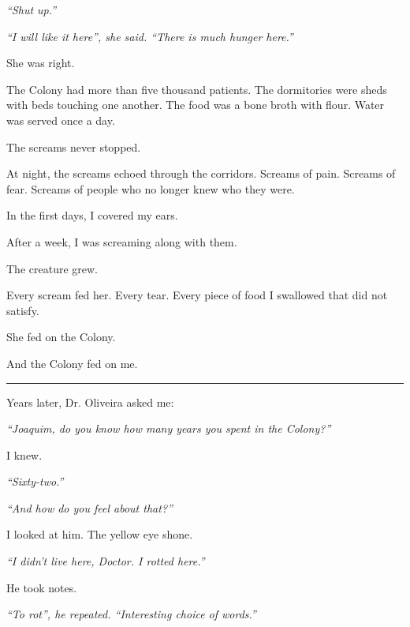 \noindent \textit{\textquotedblleft{}Shut up.\textquotedblright{}}

\noindent \textit{\textquotedblleft{}I will like it here\textquotedblright{}\textit{, she said. }\textquotedblleft{}There is much hunger here.\textquotedblright{}}

\noindent She was right.

\noindent The Colony had more than five thousand patients. The dormitories were sheds with beds touching one another. The food was a bone broth with flour. Water was served once a day.

\noindent The screams never stopped.

\noindent At night, the screams echoed through the corridors. Screams of pain. Screams of fear. Screams of people who no longer knew who they were.

\noindent In the first days, I covered my ears.

\noindent After a week, I was screaming along with them.

\noindent The creature grew.

\noindent Every scream fed her. Every tear. Every piece of food I swallowed that did not satisfy.

\noindent She fed on the Colony.

\noindent And the Colony fed on me.

\vspace{0.5em}\noindent\rule{\textwidth}{0.5pt}\vspace{0.5em}

\noindent Years later, Dr. Oliveira asked me:

\noindent \textit{\textquotedblleft{}Joaquim, do you know how many years you spent in the Colony?\textquotedblright{}}

\noindent I knew.

\noindent \textit{\textquotedblleft{}Sixty-two.\textquotedblright{}}

\noindent \textit{\textquotedblleft{}And how do you feel about that?\textquotedblright{}}

\noindent I looked at him. The yellow eye shone.

\noindent \textit{\textquotedblleft{}I didn't live here, Doctor. I rotted here.\textquotedblright{}}

\noindent He took notes.

\noindent \textit{\textquotedblleft{}To rot\textquotedblright{}\textit{, he repeated. }\textquotedblleft{}Interesting choice of words.\textquotedblright{}}

